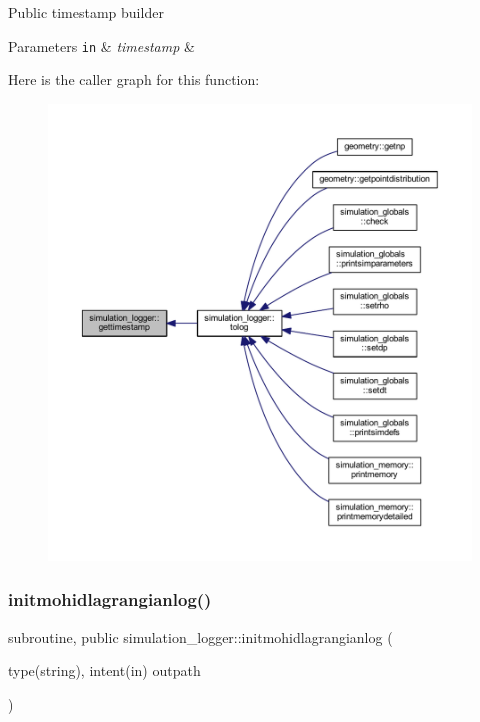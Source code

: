 Public timestamp builder 
\begin{DoxyParams}[1]{Parameters}
\mbox{\tt in}  & {\em timestamp} & \\
\hline
\end{DoxyParams}
Here is the caller graph for this function\+:\nopagebreak
\begin{figure}[H]
\begin{center}
\leavevmode
\includegraphics[width=350pt]{namespacesimulation__logger_a13446c36aac51547a72b39003f735257_icgraph}
\end{center}
\end{figure}
\mbox{\label{namespacesimulation__logger_a9c7922c1d3cd57c8322f047799fc6053}} 
\subsubsection{\texorpdfstring{initmohidlagrangianlog()}{initmohidlagrangianlog()}}
{\footnotesize\ttfamily subroutine, public simulation\+\_\+logger\+::initmohidlagrangianlog (\begin{DoxyParamCaption}\item[{type(string), intent(in)}]{outpath }\end{DoxyParamCaption})}



